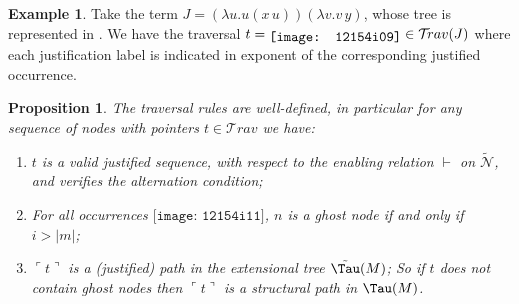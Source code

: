 \documentclass[xchauthor,chkrefs,GCNS,amsmath,amsthm,rotating,leaveRGB]{tcsg}
\makeatletter
\theoremstyle{plain}
\newtheorem{proposition}[theorem]{Proposition}
\theoremstyle{definition}
\newtheorem{example}{Example}[section]
\newcommand{\Nodes}{\mathcal{N}}
\newcommand{\NodesApp}{\Nodes_@}
\newcommand{\ExtendedNodes}{\tilde{\Nodes}}
\newcommand{\ExtendedNodesVar}{\tilde{\Nodes}_{\mathsf{var}}}
\newcommand{\ExtendedNodesLmd}{\tilde{\Nodes}_{\lambda}}
\newcommand{\enables}{\vdash}
\newcommand{\ctree}{\Tau}
\newcommand{\exttree}{\tilde{\Tau}}
\newcommand{\ExternalNodes}{\Nodes^{\mathsf{ext}}}
\newcommand{\InternalNodes}{\Nodes^{\mathsf{int}}}
\def\istraversal{\models}
\makeatother
\begin{document}
\begin{table}[t]
%
%
\end{table}




\begin{example}\label{ex:ulctrav_sample}
Take the term $J = (\lambda u . u(x\,u)) (\lambda v . v\,y)$, whose tree is
represented in . We have the
traversal $t = \raisebox{-2pt}{\texttt{[image: 12154i09]}} \in \mathcal {T}\!rav(J)$ where
each justification label is indicated in exponent of the corresponding
justified occurrence.
\end{example}

\begin{proposition}\label{prop:ulctrav_welldefined_pathview}
The traversal rules are well-defined, in particular for any sequence of nodes
with pointers $t\in \mathcal {T}\!rav$ we have:
%
\begin{enumerate}
\item[\textit{(i)}] $t$ is a valid justified sequence, with respect to the enabling
    relation $\enables $ on $\ExtendedNodes $, and verifies the alternation
    condition;
\item[\textit{(ii)}] For all occurrences ${\texttt{[image: 12154i11]}}$, $n$ is a
    ghost node if and only if $i > |m|$;
\item[\textit{(iii)}] $\ulcorner  t \urcorner  $ is a (justified) path in the
    extensional tree $\exttree (M)$; So if $t$ does not contain ghost nodes
    then $\ulcorner  t \urcorner  $ is a structural path in $\ctree (M)$.
\end{enumerate}
\end{proposition}
\end{document}
